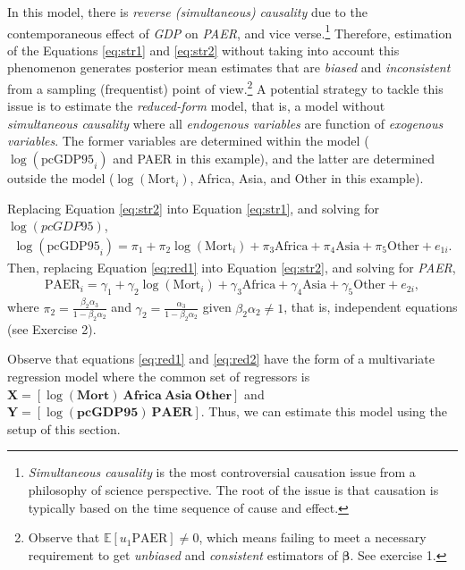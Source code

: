 In this model, there is \textit{reverse (simultaneous) causality} due to the contemporaneous effect of \textit{GDP} on \textit{PAER}, and vice verse.\footnote{\textit{Simultaneous causality} is the most controversial causation issue from a philosophy of science perspective. The root of the issue is that causation is typically based on the time sequence of cause and effect.} Therefore, estimation of the Equations \ref{eq:str1} and \ref{eq:str2} without taking into account this phenomenon generates posterior mean estimates that are \textit{biased} and \textit{inconsistent} from a sampling (frequentist) point of view.\footnote{Observe that $\mathbb{E}[u_1\text{PAER}]\neq 0$, which means failing to meet a necessary requirement to get \textit{unbiased} and \textit{consistent} estimators of $\bm{\beta}$. See exercise 1.} A potential strategy to tackle this issue is to estimate the \textit{reduced-form} model, that is, a model without \textit{simultaneous causality} where all \textit{endogenous variables} are function of \textit{exogenous variables}. The former variables are determined within the model ($\log(\text{pcGDP95}_i)$ and PAER in this example), and the latter are determined outside the model ($\log(\text{Mort}_i)$, Africa, Asia, and Other in this example).

Replacing Equation \ref{eq:str2} into Equation \ref{eq:str1}, and solving for $\log(\textit{pcGDP95})$,
\begin{align}\label{eq:red1}
	\log(\text{pcGDP95}_i)=\pi_1+\pi_2\log(\text{Mort}_i)+\pi_3 \text{Africa}+\pi_4 \text{Asia}+\pi_5 \text{Other}+e_{1i}.   
\end{align}
Then, replacing Equation \ref{eq:red1} into Equation \ref{eq:str2}, and solving for \textit{PAER},
\begin{align}\label{eq:red2}
	\text{PAER}_i=\gamma_1+\gamma_2\log(\text{Mort}_i)+\gamma_3 \text{Africa}+\gamma_4 \text{Asia}+\gamma_5 \text{Other}+e_{2i},
\end{align}
where $\pi_2=\frac{\beta_2\alpha_3}{1-\beta_2\alpha_2}$ and $\gamma_2=\frac{\alpha_3}{1-\beta_2\alpha_2}$ given $\beta_2\alpha_2\neq 1$, that is, independent equations (see Exercise 2). 

Observe that equations \ref{eq:red1} and \ref{eq:red2} have the form of a multivariate regression model where the common set of regressors is $\bm{X}=\left[\log(\textbf{Mort}) \ \textbf{Africa} \ \textbf{Asia} \ \textbf{Other}\right]$ and $\bm{Y}=\left[\log(\textbf{pcGDP95}) \ \textbf{PAER}\right]$. Thus, we can estimate this model using the setup of this section.

